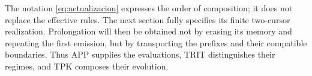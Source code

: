 The notation \eqref{eq:actualizacion} expresses the order of composition; it does not replace the effective rules. The next section fully specifies its finite two-cursor realization. Prolongation will then be obtained not by erasing its memory and repeating the first emission, but by transporting the prefixes and their compatible boundaries. Thus APP supplies the evaluations, TRIT distinguishes their regimes, and TPK composes their evolution.




